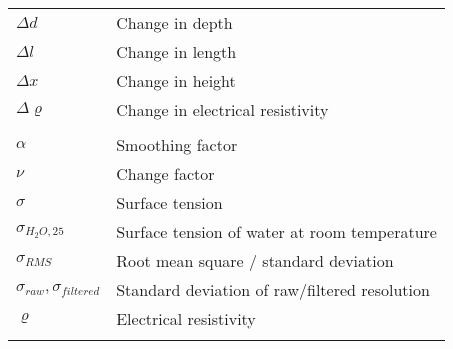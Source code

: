 \begin{longtable}[l]{@{}ll@{}}
	\( \Delta d \) & Change in depth\\
	\( \Delta l \) & Change in length\\
	\( \Delta x \) & Change in height\\
	\( \Delta \varrho \) & Change in electrical resistivity\\
	\\
	\( \alpha \) & Smoothing factor\\
	\( \nu \) & Change factor\\
	\( \sigma \) & Surface tension\\
	\( \sigma_{H_2O,25} \) & Surface tension of water at room temperature\\
	\( \sigma_{RMS} \) & Root mean square / standard deviation\\
	\( \sigma_{raw}, \sigma_{filtered} \) & Standard deviation of raw/filtered resolution\\
	\( \varrho \) & Electrical resistivity\\
	\label{tab:glossar}
\end{longtable}
